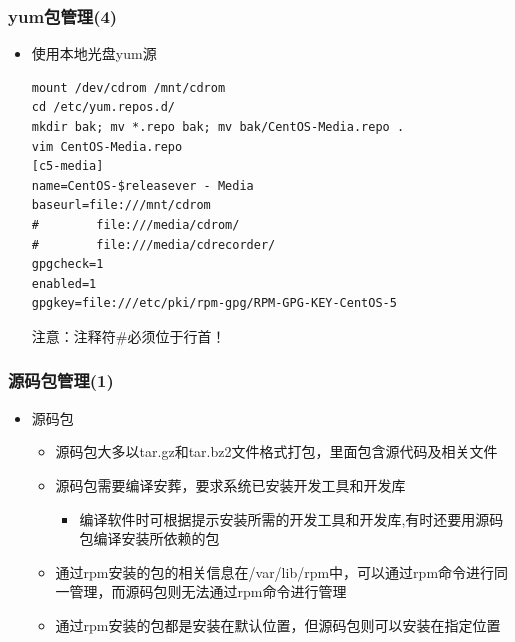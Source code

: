 \documentclass[xcolor=svgnames,presentation]{beamer}
\begin{document}
\begin{frame}[fragile]
\frametitle{yum包管理(4)}
\label{sec-3-12}
\begin{itemize}

\item 使用本地光盘yum源\\
\label{sec-3-12-1}%
\begin{verbatim}
mount /dev/cdrom /mnt/cdrom
cd /etc/yum.repos.d/
mkdir bak; mv *.repo bak; mv bak/CentOS-Media.repo .
vim CentOS-Media.repo
[c5-media]
name=CentOS-$releasever - Media
baseurl=file:///mnt/cdrom
#        file:///media/cdrom/
#        file:///media/cdrecorder/
gpgcheck=1
enabled=1
gpgkey=file:///etc/pki/rpm-gpg/RPM-GPG-KEY-CentOS-5
\end{verbatim}
注意：注释符\#必须位于行首！
\end{itemize} %
\end{frame}
\begin{frame}
\frametitle{源码包管理(1)}
\label{sec-3-13}
\begin{itemize}

\item 源码包
\label{sec-3-13-1}%
\begin{itemize}

\item 源码包大多以tar.gz和tar.bz2文件格式打包，里面包含源代码及相关文件
\label{sec-3-13-1-1}%

\item 源码包需要编译安葬，要求系统已安装开发工具和开发库
\label{sec-3-13-1-2}%
\begin{itemize}

\item 编译软件时可根据提示安装所需的开发工具和开发库,有时还要用源码包编译安装所依赖的包
\label{sec-3-13-1-2-1}%
\end{itemize} %

\item 通过rpm安装的包的相关信息在/var/lib/rpm中，可以通过rpm命令进行同一管理，而源码包则无法通过rpm命令进行管理
\label{sec-3-13-1-3}%

\item 通过rpm安装的包都是安装在默认位置，但源码包则可以安装在指定位置
\label{sec-3-13-1-4}%
\end{itemize} %
\end{itemize} %
\end{frame}
\end{document}
